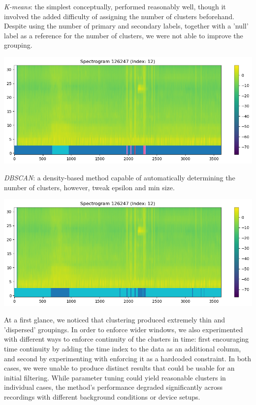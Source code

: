 \documentclass[10pt]{article}
\begin{document}
\begin{minipage}{0.6\linewidth}
\textit{K-means}: the simplest conceptually, performed reasonably well, though it involved the added difficulty of assigning the number of clusters beforehand. Despite using the number of primary and secondary labels, together with a 'null' label as a reference for the number of clusters, we were not able to improve the grouping.
\end{minipage}
\hfill
\begin{minipage}{0.35\linewidth}
  \includegraphics[width=\linewidth]{img/train_spectrogram_12_kmeans.png}
\end{minipage}

\vspace{1em}

\begin{minipage}{0.6\linewidth}
\textit{DBSCAN}: a density-based method capable of automatically determining the number of clusters, however, tweak epsilon and min size.
\end{minipage}
\hfill
\begin{minipage}{0.35\linewidth}
  \includegraphics[width=\linewidth]{img/train_spectrogram_12_dbscan.png}
\end{minipage}

At a first glance, we noticed that clustering produced extremely thin and 'dispersed' groupings. In order to enforce wider windows, we also experimented with different ways to enforce continuity of the clusters in time: first encouraging time continuity by adding the time index to the data as an additional column, and second by experimenting with enforcing it as a hardcoded constraint. In both cases, we were unable to produce distinct results that could be usable for an initial filtering. While parameter tuning could yield reasonable clusters in individual cases, the method's performance degraded significantly across recordings with different background conditions or device setups.
\end{document}
